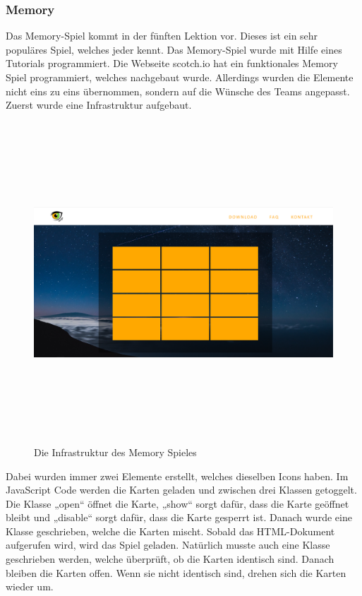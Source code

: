 \subsubsection{Memory}
Das Memory-Spiel kommt in der fünften Lektion vor. Dieses ist ein sehr populäres Spiel, welches jeder kennt. Das Memory-Spiel wurde mit Hilfe eines Tutorials programmiert. Die Webseite scotch.io \cite{memorytutorial} hat ein funktionales Memory Spiel programmiert, welches nachgebaut wurde. Allerdings wurden die Elemente nicht eins zu eins übernommen, sondern auf die Wünsche des Teams angepasst. Zuerst wurde eine Infrastruktur aufgebaut. 
\begin{figure}[h]
	\centering
\includegraphics[width=12cm,height=12cm,keepaspectratio]{webseite_memory} 
	\caption{Die Infrastruktur des Memory Spieles}
\end{figure}
Dabei wurden immer zwei Elemente erstellt, welches dieselben Icons haben. Im JavaScript Code werden die Karten geladen und zwischen drei Klassen getoggelt. Die Klasse „open“ öffnet die Karte, „show“ sorgt dafür, dass die Karte geöffnet bleibt und „disable“ sorgt dafür, dass die Karte gesperrt ist. Danach wurde eine Klasse geschrieben, welche die Karten mischt. Sobald das HTML-Dokument aufgerufen wird, wird das Spiel geladen. Natürlich musste auch eine Klasse geschrieben werden, welche überprüft, ob die Karten identisch sind. Danach bleiben die Karten offen. Wenn sie nicht identisch sind, drehen sich die Karten wieder um. 
